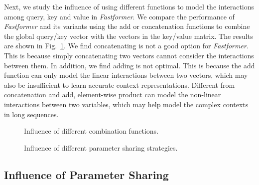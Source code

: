 \documentclass[11pt,a4paper]{article}
\begin{document}
Next, we study the influence of using different functions to model the interactions among query, key and value in \textit{Fastformer}.
We compare the performance of \textit{Fastformer} and its variants using the add or concatenation functions to combine the global query/key vector with the vectors in the key/value matrix.
The results are shown in Fig.~\ref{fig.ab}.
We find concatenating is not a good option for \textit{Fastformer}.
This is because simply concatenating two vectors cannot consider the interactions between them.
In addition, we find adding is not optimal.
This is because the add function can only model the linear interactions between two vectors, which may also be insufficient to learn accurate context representations.
Different from concatenation and add, element-wise product can model the non-linear interactions between two variables, which may help model the complex contexts in long sequences.




\begin{figure}[!t]
  \centering
  \caption{Influence of different combination functions.}\label{fig.ab}

\end{figure}

\begin{figure}[!t]
  \centering
  \caption{Influence of different parameter sharing strategies.}\label{fig.eff}

\end{figure}

\subsection{Influence of Parameter Sharing}
\end{document}
